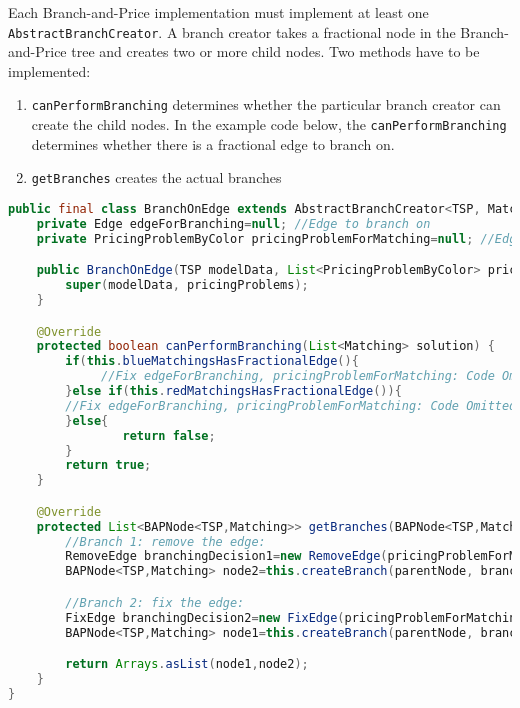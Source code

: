 \documentclass[a4paper]{article}
\newenvironment{myblock}[1]{%
    \tcolorbox[beamer,%
    noparskip,breakable,
    colback=lightBlueCodeBlock,colframe=darkBlueCodeBlock,%
    colbacklower=darkBlueCodeBlock!75!lightBlueCodeBlock,%
    coltitle=blueTitleCodeBlock,
    title=#1]}%
    {\endtcolorbox}
\newcommand{\code}[1]{\lstinline[language=java, style=seminar]!#1!}
\begin{document}
Each Branch-and-Price implementation must implement at least one \code{AbstractBranchCreator}. A branch creator takes a fractional node in the Branch-and-Price tree and creates two or more child nodes. Two methods have to be implemented:
\begin{enumerate}
 \item \code{canPerformBranching} determines whether the particular branch creator can create the child nodes. In the example code below, the \code{canPerformBranching} determines whether there is a fractional edge to branch on.
 \item \code{getBranches} creates the actual branches
\end{enumerate}
\begin{myblock}{BranchOnEdge}
\begin{lstlisting}[language=java, style=eclipseArticle, xleftmargin=2em]  
public final class BranchOnEdge extends AbstractBranchCreator<TSP, Matching, PricingProblemByColor>{
    private Edge edgeForBranching=null; //Edge to branch on
    private PricingProblemByColor pricingProblemForMatching=null; //Edge is fractional in red or blue matching

    public BranchOnEdge(TSP modelData, List<PricingProblemByColor> pricingProblems){
        super(modelData, pricingProblems);
    }

    @Override
    protected boolean canPerformBranching(List<Matching> solution) {
        if(this.blueMatchingsHasFractionalEdge(){
             //Fix edgeForBranching, pricingProblemForMatching: Code Omitted   
        }else if(this.redMatchingsHasFractionalEdge()){
		//Fix edgeForBranching, pricingProblemForMatching: Code Omitted
        }else{
                return false;
        }
        return true;
    }

    @Override
    protected List<BAPNode<TSP,Matching>> getBranches(BAPNode<TSP,Matching> parentNode) {
        //Branch 1: remove the edge:
        RemoveEdge branchingDecision1=new RemoveEdge(pricingProblemForMatching, edgeForBranching);
        BAPNode<TSP,Matching> node2=this.createBranch(parentNode, branchingDecision1, parentNode.getSolution(), parentNode.getInequalities());

        //Branch 2: fix the edge:
        FixEdge branchingDecision2=new FixEdge(pricingProblemForMatching, edgeForBranching);
        BAPNode<TSP,Matching> node1=this.createBranch(parentNode, branchingDecision2, parentNode.getSolution(), parentNode.getInequalities());

        return Arrays.asList(node1,node2);
    }
}
\end{lstlisting}
\end{myblock}
\end{document}
